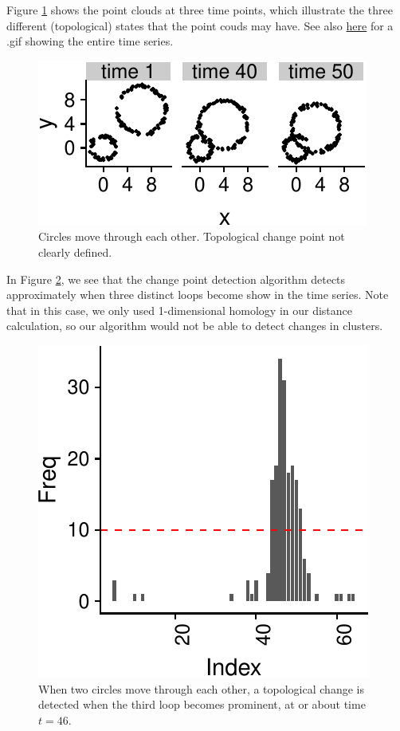 \documentclass[smallextended]{svjour3}       %
\begin{document}
\begin{example}
Figure \ref{fig:7} shows the point clouds at three time points, which illustrate the three different (topological) states that the point couds may have. See also \href{http://stat.slu.edu/~speegle/Circles2.gif}{here} for a .gif showing the entire time series.

\begin{figure}\includegraphics{springer_template_files/figure-latex/chunk_7-1} 
\caption{Circles move through each other. Topological change point not clearly defined.}
\label{fig:7}\end{figure}

In Figure \ref{fig:8}, we see that the change point detection algorithm detects approximately
when three distinct loops become show in the time series. Note that in this case, we only
used 1-dimensional homology in our distance calculation, so our algorithm would not be able to detect changes
in clusters. 

\begin{figure}\includegraphics{springer_template_files/figure-latex/chunk_7_5-1} 
\caption{When two circles move through each other, a topological change is detected when the third loop becomes prominent, at or about time $t = 46$.}
\label{fig:8}\end{figure}


\end{example}
\end{document}
